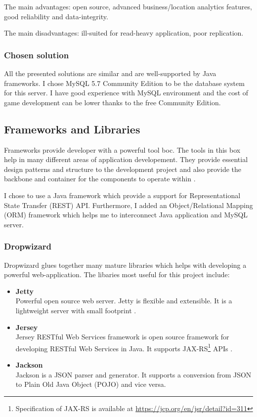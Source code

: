 		The main advantages: open source, advanced business/location analytics features, good reliability and data-integrity.
		
		The main disadvantages: ill-suited for read-heavy application, poor replication.
				
		\subsubsection{Chosen solution}
		All the presented solutions are similar and are well-supported by Java frameworks. I chose MySQL 5.7 Community Edition to be the database system for this server. I have good experience with MySQL environment and the cost of game development can be lower thanks to the free Community Edition. 
		
	\subsection{Frameworks and Libraries}
	Frameworks provide developer with a powerful tool boc. The tools in this box help in many different areas of application developement. They provide essential design patterns and structure to the development project and also provide the backbone and container for the components to operate within \cite{frameworks}.
	
	I chose to use a Java framework which provide a support for Representational State Transfer (REST) API. Furthermore, I added an Object/Relational Mapping (ORM) framework which helps me to interconnect Java application and MySQL server.
	
		\subsubsection{Dropwizard}
		Dropwizard \cite{dropwizard} glues together many mature libraries which helps with developing a powerful web-application. The libaries most useful for this project include:
		\begin{itemize}
			\item \textbf{Jetty}\\
			Powerful open source web server. Jetty is flexible and extensible. It is a lightweight server with small footprint \cite{jetty}.
			\item \textbf{Jersey}\\
			Jersey RESTful Web Services framework is open source framework for developing RESTful Web Services in Java. It supports JAX-RS\footnote{Specification of JAX-RS is available at \url{https://jcp.org/en/jsr/detail?id=311}} APIs \cite{jersey}.
			\item \textbf{Jackson}\\
			Jackson is a JSON parser and generator. It supports a conversion from JSON to Plain Old Java Object (POJO) and vice versa.			
		\end{itemize}
